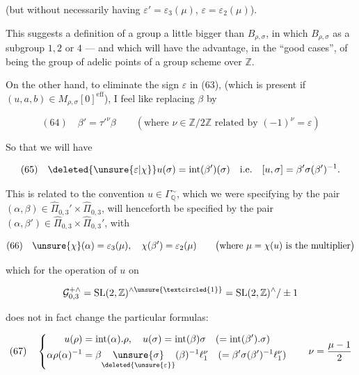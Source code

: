 (but without necessarily having
$\varepsilon'=\varepsilon_3(\mu)$, $\varepsilon=\varepsilon_2(\mu)$).

This suggests a definition of a group a little bigger than $B_{\rho,\sigma}$,
in which $B_{\rho,\sigma}$  
as a  subgroup 
$1,2$ or $4$ --- and which will have the advantage, in the ``good cases'', of being the group
of adelic points of a  group scheme over $\mathbb Z$.

On the other hand, to  eliminate the sign
$\varepsilon$ in (63), (which is present  if
$(u,a,b)\in M_{\rho,\sigma}[0]^{\mathrm{eff}}$), I feel like replacing $\beta$ by


\[
(64)\quad \beta'=\tau'^{\nu}\beta
\qquad\left(\text{where }\nu\in\mathbb Z/2\mathbb Z\text{ related by }
(-1)^\nu=\varepsilon\right)
\]

So that we will have

\[
(65)\quad \deleted{\unsure{\varepsilon|\chi}}u(\sigma)=\operatorname{int}(\beta')(\sigma)
\quad\text{i.e.}\quad [u,\sigma]=\beta'\sigma(\beta')^{-1}.
\]

This is related to the convention 
$u\in\Gamma_{\mathbb Q}^{\sim}$, which we were specifying by the pair
$(\alpha,\beta)\in\widehat{\Pi}_{0,3}'\times\widehat{\Pi}_{0,3}$,
will henceforth be specified by the pair
$(\alpha,\beta')\in\widehat{\Pi}_{0,3}\times\widehat{\Pi}_{0,3}'$, with

\[
(66)\quad\unsure{\chi}(\alpha)=\varepsilon_3(\mu),
\quad\chi(\beta')=\varepsilon_2(\mu)
\qquad\bigl(\text{where }\mu=\chi(u)\text{ is the multiplier}\bigr)
\]

which  for the operation of $u$ on

\[
\mathcal G_{0,3}^{+\wedge}
=\mathrm{SL}(2,\mathbb Z)^{\wedge\unsure{\textcircled{1}}}
=\mathrm{SL}(2,\mathbb Z)^{\wedge}/\pm1
\]

does not in fact change the particular formulas:

\[
(67)\quad\left\{\begin{aligned}
u(\rho)&=\operatorname{int}(\alpha).\rho,\quad
u(\sigma)=\operatorname{int}(\beta)\sigma
\quad(=\operatorname{int}(\beta').\sigma)\\
\alpha\rho(\alpha)^{-1}
&=\beta\underset{\deleted{\unsure{\varepsilon}}}{\unsure{\sigma}}(\beta)^{-1}\ell_1^\nu
\quad(=\beta'\sigma(\beta')^{-1}\ell_1^\nu)
\end{aligned}\right.
\qquad\nu=\frac{\mu-1}{2}
\]

